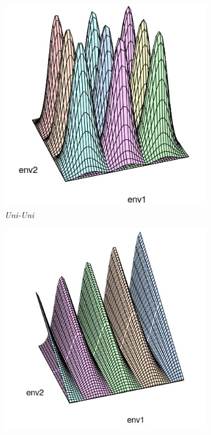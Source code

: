 	
		\begin{figure}[h!]
			
			\begin{subfigure}{0.3\textwidth}
				\centering
				\includegraphics[width=1\linewidth]{../02_Figures/Uni-Uni_Model}
				\caption{\textit{Uni-Uni}}
				\label{fig:bivariateExample1}
			\end{subfigure}
			\begin{subfigure}{0.3\textwidth}
				\centering
				\includegraphics[width=1\linewidth]{../02_Figures/Uni-Li_Model}

\end{subfigure}
\end{figure}
